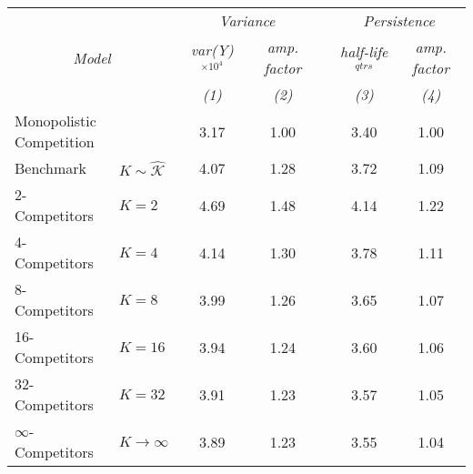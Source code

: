 \begin{tabular}{llccccc}
	 && \multicolumn{2}{c}{\emph{Variance}} && \multicolumn{2}{c}{\emph{Persistence}}\\ 
 	 \cline{3-4} \cline{6-7} 
	 \multicolumn{2}{c}{\emph{Model}} & \emph{var(Y) $^{\times 10^{4}}$} & \emph{amp. factor} && \emph{half-life} $^{qtrs}$ & \emph{amp. factor} \\ 
	 && \emph{(1)} & \emph{(2)} && \emph{(3)} & \emph{(4)} \\ 
	 \hline 
	 \multicolumn{2}{l|}{Monopolistic Competition} & 3.17 & 1.00 && 3.40 & 1.00 \\ 
	 Benchmark & \multicolumn{1}{l|}{$K\sim \hat{\mathcal{K}}$} & 4.07 & 1.28 && 3.72 & 1.09 \\ 
	 \hline 
	 2-Competitors & \multicolumn{1}{l|}{$K=2$} & 4.69 & 1.48 && 4.14 & 1.22 \\ 
	 4-Competitors & \multicolumn{1}{l|}{$K=4$} & 4.14 & 1.30 && 3.78 & 1.11 \\ 
	 8-Competitors & \multicolumn{1}{l|}{$K=8$} & 3.99 & 1.26 && 3.65 & 1.07 \\ 
	 16-Competitors & \multicolumn{1}{l|}{$K=16$} & 3.94 & 1.24 && 3.60 & 1.06 \\ 
	 32-Competitors & \multicolumn{1}{l|}{$K=32$} & 3.91 & 1.23 && 3.57 & 1.05 \\ 
	 $\infty$-Competitors & \multicolumn{1}{l|}{$K\to\infty$} & 3.89 & 1.23 && 3.55 & 1.04 \\ 
	 \hline 
\end{tabular}